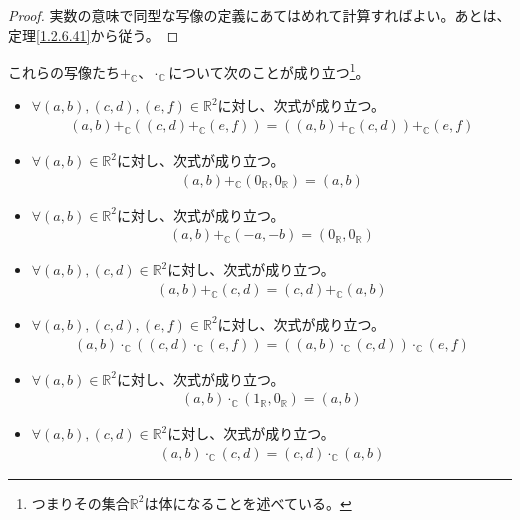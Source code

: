 \documentclass[dvipdfmx]{jsarticle}
\begin{document}
\begin{proof}
実数の意味で同型な写像の定義にあてはめれて計算すればよい。あとは、定理\ref{1.2.6.41}から従う。
\end{proof}
\begin{thm}\label{1.2.6.48}
これらの写像たち$+_{\mathbb{C}}$、$\cdot_{\mathbb{C}}$について次のことが成り立つ\footnote{つまりその集合$\mathbb{R}^{2}$は体になることを述べている。}。
\begin{itemize}
\item
  $\forall(a,b),(c,d),(e,f) \in \mathbb{R}^{2}$に対し、次式が成り立つ。
\begin{align*}
(a,b) +_{\mathbb{C}}\left( (c,d) +_{\mathbb{C}}(e,f) \right) = \left( (a,b) +_{\mathbb{C}}(c,d) \right) +_{\mathbb{C}}(e,f)
\end{align*}
\item
  $\forall(a,b) \in \mathbb{R}^{2}$に対し、次式が成り立つ。
\begin{align*}
(a,b) +_{\mathbb{C}}\left( 0_{\mathbb{R}},0_{\mathbb{R}} \right) = (a,b)
\end{align*}
\item
  $\forall(a,b) \in \mathbb{R}^{2}$に対し、次式が成り立つ。
\begin{align*}
(a,b) +_{\mathbb{C}}( - a, - b) = \left( 0_{\mathbb{R}},0_{\mathbb{R}} \right)
\end{align*}
\item
  $\forall(a,b),(c,d) \in \mathbb{R}^{2}$に対し、次式が成り立つ。
\begin{align*}
(a,b) +_{\mathbb{C}}(c,d) = (c,d) +_{\mathbb{C}}(a,b)
\end{align*}
\item
  $\forall(a,b),(c,d),(e,f) \in \mathbb{R}^{2}$に対し、次式が成り立つ。
\begin{align*}
(a,b) \cdot_{\mathbb{C}}\left( (c,d) \cdot_{\mathbb{C}}(e,f) \right) = \left( (a,b) \cdot_{\mathbb{C}}(c,d) \right) \cdot_{\mathbb{C}}(e,f)
\end{align*}
\item
  $\forall(a,b) \in \mathbb{R}^{2}$に対し、次式が成り立つ。
\begin{align*}
(a,b) \cdot_{\mathbb{C}}\left( 1_{\mathbb{R}},0_{\mathbb{R}} \right) = (a,b)
\end{align*}
\item
  $\forall(a,b),(c,d) \in \mathbb{R}^{2}$に対し、次式が成り立つ。
\begin{align*}
(a,b) \cdot_{\mathbb{C}}(c,d) = (c,d) \cdot_{\mathbb{C}}(a,b)
\end{align*}

\end{itemize}
\end{thm}
\end{document}
